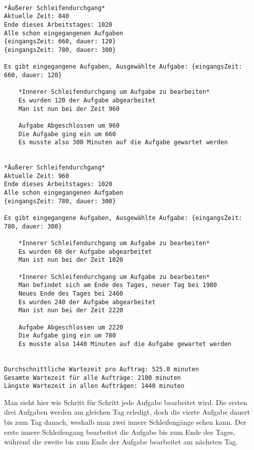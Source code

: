 \documentclass[a4paper,10pt,ngerman]{scrartcl}
\begin{document}
\begin{lstlisting}[numbers=none]

*Äußerer Schleifendurchgang*
Aktuelle Zeit: 840
Ende dieses Arbeitstages: 1020
Alle schon eingegangenen Aufgaben
{eingangsZeit: 660, dauer: 120}
{eingangsZeit: 780, dauer: 300}

Es gibt eingegangene Aufgaben, Ausgewählte Aufgabe: {eingangsZeit: 660, dauer: 120}

    *Innerer Schleifendurchgang um Aufgabe zu bearbeiten*
    Es wurden 120 der Aufgabe abgearbeitet
    Man ist nun bei der Zeit 960

    Aufgabe Abgeschlossen um 960
    Die Aufgabe ging ein um 660
    Es musste also 300 Minuten auf die Aufgabe gewartet werden


*Äußerer Schleifendurchgang*
Aktuelle Zeit: 960
Ende dieses Arbeitstages: 1020
Alle schon eingegangenen Aufgaben
{eingangsZeit: 780, dauer: 300}

Es gibt eingegangene Aufgaben, Ausgewählte Aufgabe: {eingangsZeit: 780, dauer: 300}

    *Innerer Schleifendurchgang um Aufgabe zu bearbeiten*
    Es wurden 60 der Aufgabe abgearbeitet
    Man ist nun bei der Zeit 1020

    *Innerer Schleifendurchgang um Aufgabe zu bearbeiten*
    Man befindet sich am Ende des Tages, neuer Tag bei 1980
    Neues Ende des Tages bei 2460
    Es wurden 240 der Aufgabe abgearbeitet
    Man ist nun bei der Zeit 2220

    Aufgabe Abgeschlossen um 2220
    Die Aufgabe ging ein um 780
    Es musste also 1440 Minuten auf die Aufgabe gewartet werden


Durchschnittliche Wartezeit pro Auftrag: 525.0 minuten
Gesamte Wartezeit für alle Aufträge: 2100 minuten
Längste Wartezeit in allen Aufträgen: 1440 minuten
\end{lstlisting}

Man sieht hier wie Schritt für Schritt jede Aufgabe bearbeitet wird.
Die ersten drei Aufgaben werden am gleichen Tag erledigt,
doch die vierte Aufgabe dauert bis zum Tag danach,
weshalb man zwei innere Schleifengänge sehen kann.
Der erste innere Schleifengang bearbeitet die Aufgabe bis zum Ende des Tages,
während die zweite bis zum Ende der Aufgabe bearbeitet am nächsten Tag.
\end{document}
